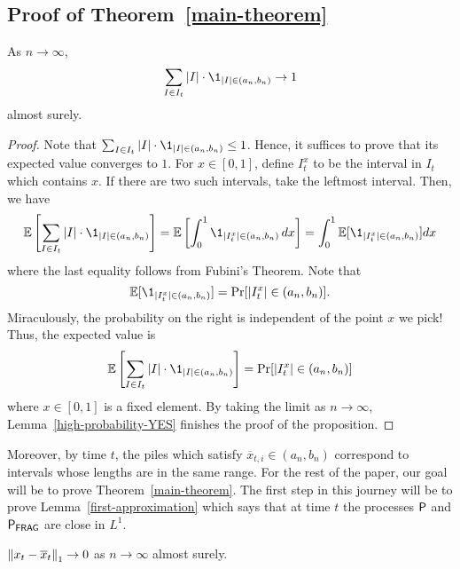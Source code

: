 \documentclass[12pt]{article}
\begin{document}
\subsection{Proof of Theorem~\ref{main-theorem}}

\begin{prop}
	As $n \to \infty$, 
	\[
		\sum_{I \in I_t} |I| \cdot \1_{|I| \in (a_n, b_n)} \to 1
	\]
	almost surely. 
\end{prop}

\begin{proof}
	Note that $\sum_{I \in I_t} |I| \cdot \1_{|I| \in (a_n, b_n)} \leq 1$. Hence, it suffices to prove that its expected value converges to $1$. For $x \in [0, 1]$, define $I_t^x$ to be the interval in $I_t$ which contains $x$. If there are two such intervals, take the leftmost interval. Then, we have
	\[
		\EE \left [ \sum_{I \in I_t} |I| \cdot \1_{|I| \in (a_n, b_n)} \right ] = \EE \left [ \int_0^1 \1_{|I_t^x| \in (a_n, b_n)} \, dx \right ] = \int_0^1 \EE[\1_{|I_t^x| \in (a_n, b_n)} ] dx
	\]
	where the last equality follows from Fubini's Theorem. Note that 
	\[
		\EE[\1_{|I_t^x| \in (a_n, b_n)}] = \Pr[|I_t^x| \in (a_n, b_n)].
	\]
	Miraculously, the probability on the right is independent of the point $x$ we pick! Thus, the expected value is
	\[ 
		\EE \left [ \sum_{I \in I_t} |I| \cdot \1_{|I| \in (a_n, b_n)} \right ] = \Pr[|I_t^x| \in (a_n, b_n)]
	\]
	where $x \in [0, 1]$ is a fixed element. By taking the limit as $n \to \infty$, Lemma~\ref{high-probability-YES} finishes the proof of the proposition. 
\end{proof}

Moreover, by time $t$, the piles which satisfy $\overline{x}_{t, i} \in (a_n, b_n)$ correspond to intervals whose lengths are in the same range. For the rest of the paper, our goal will be to prove Theorem~\ref{main-theorem}. The first step in this journey will be to prove Lemma~\ref{first-approximation} which says that at time $t$ the processes $\mathsf{P}$ and $\mathsf{P}_{\mathsf{FRAG}}$ are close in $L^1$. 
\begin{lem} \label{first-approximation}
	$\left\lVert x_t - \overline{x}_t \right\rVert_1 \to 0$ as $n \to \infty$ almost surely. 
\end{lem}
\end{document}
